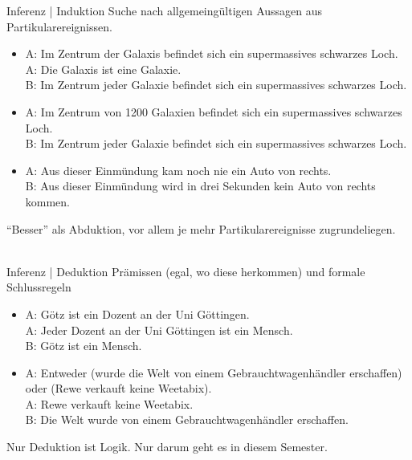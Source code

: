 \begin{frame}
  {Inferenz | Induktion}
  \onslide<+->
  \onslide<+->
  Suche nach \alert{allgemeingültigen Aussagen} aus Partikularereignissen.\\
  \Halbzeile
  \begin{itemize}[<+->]
    \item A: Im Zentrum der Galaxis befindet sich ein supermassives schwarzes Loch.\\
          A: Die Galaxis ist eine Galaxie.\\
          B: Im Zentrum jeder Galaxie befindet sich ein supermassives schwarzes Loch.
    \item A: Im Zentrum von 1200 Galaxien befindet sich ein supermassives schwarzes Loch.\\
          B: Im Zentrum jeder Galaxie befindet sich ein supermassives schwarzes Loch.
    \item A: Aus dieser Einmündung kam noch nie ein Auto von rechts.\\
          B: Aus dieser Einmündung wird in drei Sekunden kein Auto von rechts kommen.
  \end{itemize}
  \onslide<+->
  \Zeile 
  \centering 
  \alert{"`Besser"' als Abduktion, vor allem je mehr Partikularereignisse zugrundeliegen.}\\
  \\
\end{frame}

\begin{frame}
  {Inferenz | Deduktion}
  \onslide<+->
  \onslide<+->
  \alert{Prämissen} (egal, wo diese herkommen) und formale \alert{Schlussregeln}\\
  \Halbzeile
  \begin{itemize}[<+->]
    \item A: Götz ist ein Dozent an der Uni Göttingen.\\
      A: Jeder Dozent an der Uni Göttingen ist ein Mensch.\\
      B: Götz ist ein Mensch.
    \item A: Entweder (wurde die Welt von einem Gebrauchtwagenhändler erschaffen) oder (Rewe verkauft keine Weetabix).\\
      A: Rewe verkauft keine Weetabix.\\
      B: Die Welt wurde von einem Gebrauchtwagenhändler erschaffen.
  \end{itemize}
  \onslide<+->
  \Zeile
  \centering 
  \alert{Nur Deduktion ist Logik. Nur darum geht es in diesem Semester.}
\end{frame}

